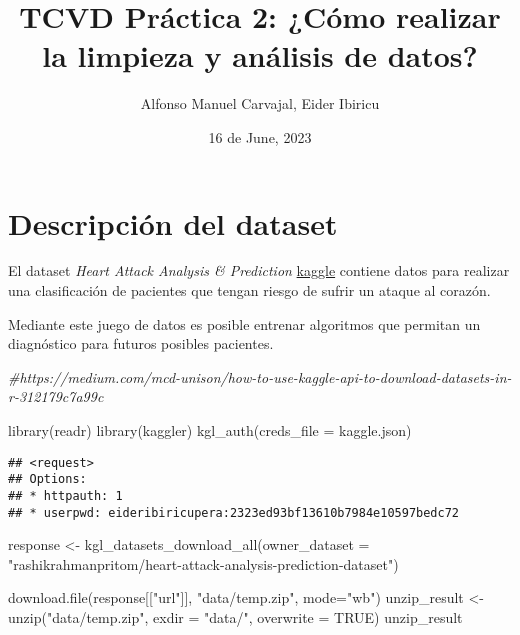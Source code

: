 \documentclass[
]{article}
\title{TCVD Práctica 2: ¿Cómo realizar la limpieza y análisis de datos?}
\author{Alfonso Manuel Carvajal, Eider Ibiricu}
\date{16 de June, 2023}
\newenvironment{Shaded}{\begin{snugshade}}{\end{snugshade}}
\newcommand{\AttributeTok}[1]{\textcolor[rgb]{0.77,0.63,0.00}{#1}}
\newcommand{\CommentTok}[1]{\textcolor[rgb]{0.56,0.35,0.01}{\textit{#1}}}
\newcommand{\ConstantTok}[1]{\textcolor[rgb]{0.00,0.00,0.00}{#1}}
\newcommand{\FunctionTok}[1]{\textcolor[rgb]{0.00,0.00,0.00}{#1}}
\newcommand{\NormalTok}[1]{#1}
\newcommand{\OtherTok}[1]{\textcolor[rgb]{0.56,0.35,0.01}{#1}}
\newcommand{\StringTok}[1]{\textcolor[rgb]{0.31,0.60,0.02}{#1}}
\begin{document}
\maketitle

\hypertarget{descripciuxf3n-del-dataset}{%
\section{Descripción del dataset}\label{descripciuxf3n-del-dataset}}

El dataset \emph{Heart Attack Analysis \& Prediction}
\href{https://www.kaggle.com/datasets/rashikrahmanpritom/heart-attack-analysis-prediction-dataset}{kaggle}
contiene datos para realizar una clasificación de pacientes que tengan
riesgo de sufrir un ataque al corazón.

Mediante este juego de datos es posible entrenar algoritmos que permitan
un diagnóstico para futuros posibles pacientes.

\begin{Shaded}
\begin{Highlighting}[]
\CommentTok{\#https://medium.com/mcd{-}unison/how{-}to{-}use{-}kaggle{-}api{-}to{-}download{-}datasets{-}in{-}r{-}312179c7a99c}

\FunctionTok{library}\NormalTok{(readr)}
\FunctionTok{library}\NormalTok{(kaggler)}
\FunctionTok{kgl\_auth}\NormalTok{(}\AttributeTok{creds\_file =} \StringTok{\textquotesingle{}kaggle.json\textquotesingle{}}\NormalTok{)}
\end{Highlighting}
\end{Shaded}

\begin{verbatim}
## <request>
## Options:
## * httpauth: 1
## * userpwd: eideribiricupera:2323ed93bf13610b7984e10597bedc72
\end{verbatim}

\begin{Shaded}
\begin{Highlighting}[]
\NormalTok{response }\OtherTok{\textless{}{-}} \FunctionTok{kgl\_datasets\_download\_all}\NormalTok{(}\AttributeTok{owner\_dataset =}
            \StringTok{"rashikrahmanpritom/heart{-}attack{-}analysis{-}prediction{-}dataset"}\NormalTok{)}

\FunctionTok{download.file}\NormalTok{(response[[}\StringTok{"url"}\NormalTok{]], }\StringTok{"data/temp.zip"}\NormalTok{, }\AttributeTok{mode=}\StringTok{"wb"}\NormalTok{)}
\NormalTok{unzip\_result }\OtherTok{\textless{}{-}} \FunctionTok{unzip}\NormalTok{(}\StringTok{"data/temp.zip"}\NormalTok{, }\AttributeTok{exdir =} \StringTok{"data/"}\NormalTok{, }\AttributeTok{overwrite =} \ConstantTok{TRUE}\NormalTok{)}
\NormalTok{unzip\_result}
\end{Highlighting}
\end{Shaded}
\end{document}
